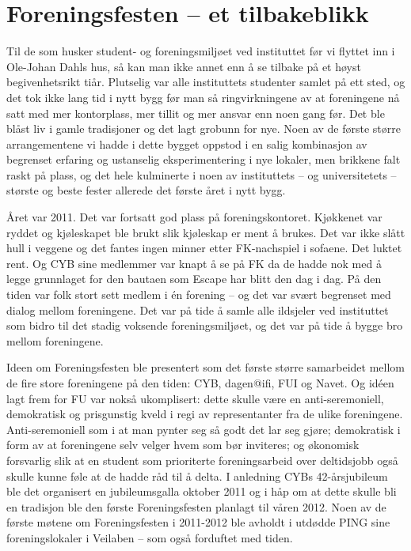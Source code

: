 \chapter[Foreningsfesten]{Foreningsfesten – et tilbakeblikk}

\author{Skrevet av Suhas Govind Joshi}

Til de som husker student- og foreningsmiljøet ved instituttet før vi flyttet inn i Ole-Johan Dahls hus, så kan man ikke annet enn å se tilbake på et høyst begivenhetsrikt tiår. Plutselig var alle instituttets studenter samlet på ett sted, og det tok ikke lang tid i nytt bygg før man så ringvirkningene av at foreningene nå satt med mer kontorplass, mer tillit og mer ansvar enn noen gang før. Det ble blåst liv i gamle tradisjoner og det lagt grobunn for nye. Noen av de første større arrangementene vi hadde i dette bygget oppstod i en salig kombinasjon av begrenset erfaring og ustanselig eksperimentering i nye lokaler, men brikkene falt raskt på plass, og det hele kulminerte i noen av instituttets – og universitetets – største og beste fester allerede det første året i nytt bygg.

Året var 2011. Det var fortsatt god plass på foreningskontoret. Kjøkkenet var ryddet og kjøleskapet ble brukt slik kjøleskap er ment å brukes. Det var ikke slått hull i veggene og det fantes ingen minner etter FK-nachspiel i sofaene. Det luktet rent. Og CYB sine medlemmer var knapt å se på FK da de hadde nok med å legge grunnlaget for den bautaen som Escape har blitt den dag i dag. På den tiden var folk stort sett medlem i én forening – og det var svært begrenset med dialog mellom foreningene. Det var på tide å samle alle ildsjeler ved instituttet som bidro til det stadig voksende foreningsmiljøet, og det var på tide å bygge bro mellom foreningene.

Ideen om Foreningsfesten ble presentert som det første større samarbeidet mellom de fire store foreningene på den tiden: CYB, dagen@ifi, FUI og Navet. Og idéen lagt frem for FU var nokså ukomplisert: dette skulle være en anti-seremoniell, demokratisk og prisgunstig kveld i regi av representanter fra de ulike foreningene. Anti-seremoniell som i at man pynter seg så godt det lar seg gjøre; demokratisk i form av at foreningene selv velger hvem som bør inviteres; og økonomisk forsvarlig slik at en student som prioriterte foreningsarbeid over deltidsjobb også skulle kunne føle at de hadde råd til å delta. I anledning CYBs 42-årsjubileum ble det organisert en jubileumsgalla oktober 2011 og i håp om at dette skulle bli en tradisjon ble den første Foreningsfesten planlagt til våren 2012. Noen av de første møtene om Foreningsfesten i 2011-2012 ble avholdt i utdødde PING sine foreningslokaler i Veilaben – som også forduftet med tiden.

